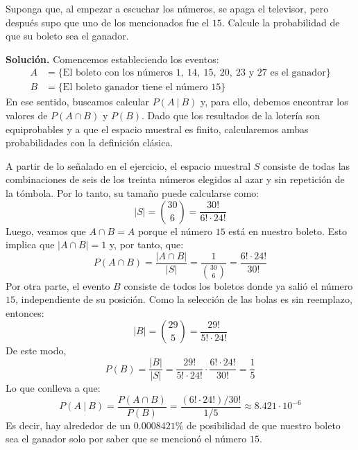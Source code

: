 \documentclass[12pt]{article}
\begin{document}
Suponga que, al empezar a escuchar los números, se apaga el televisor, pero después supo que uno de los mencionados fue el $15$. Calcule la probabilidad de que su boleto sea el ganador.

\textbf{Solución.} Comencemos estableciendo los eventos:
\begin{align*}
A &= \{\text{El boleto con los números } 1, \ 14, \ 15, \ 20, \ 23 \text{ y } 27 \text{ es el ganador}\} \\
B &= \{\text{El boleto ganador tiene el número } 15\}
\end{align*}
En ese sentido, buscamos calcular $P(A \ | \ B)$ y, para ello, debemos encontrar los valores de $P(A \cap B)$ y $P(B)$. Dado que los resultados de la lotería son equiprobables y a que el espacio muestral es finito, calcularemos ambas probabilidades con la definición clásica.

A partir de lo señalado en el ejercicio, el espacio muestral $S$ consiste de todas las combinaciones de seis de los treinta números elegidos al azar y sin repetición de la tómbola. Por lo tanto, su tamaño puede calcularse como:
\[
  |S| = \binom{30}{6} = \frac{30!}{6! \cdot 24!}
\]
Luego, veamos que $A \cap B = A$ porque el número $15$ está en nuestro boleto. Esto implica que $|A \cap B| = 1$ y, por tanto, que:
\[
  P(A \cap B) = \frac{|A \cap B|}{|S|} = \frac{1}{\binom{30}{6}} = \frac{6! \cdot 24!}{30!}
\]
Por otra parte, el evento $B$ consiste de todos los boletos donde ya salió el número $15$, independiente de su posición. Como la selección de las bolas es sin reemplazo, entonces:
\[
  |B| = \binom{29}{5} = \frac{29!}{5! \cdot 24!}
\]
De este modo,
\[
  P(B) = \frac{|B|}{|S|} = \frac{29!}{5! \cdot 24!} \cdot \frac{6! \cdot 24!}{30!} = \frac{1}{5}
\]
Lo que conlleva a que:
\[
  P(A \ | \ B) = \frac{P(A \cap B)}{P(B)} = \frac{(6! \cdot 24!)/30!}{1/5} \approx 8.421 \cdot 10^{-6}
\]
Es decir, hay alrededor de un $0.0008421\%$ de posibilidad de que nuestro boleto sea el ganador solo por saber que se mencionó el número $15$.
\end{document}
